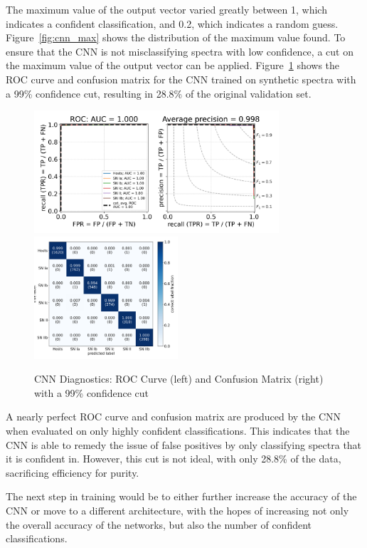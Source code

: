 The maximum value of the output vector varied greatly between 1, which indicates a 
confident classification, and 0.2, which indicates a random guess. Figure~\ref{fig:cnn_max} shows
the distribution of the maximum value found. To ensure that the CNN is not
misclassifying spectra with low confidence, a cut on the maximum value of the
output vector can be applied. Figure~\ref{fig:cnn_qual2} shows the ROC curve and confusion matrix
for the CNN trained on synthetic spectra with a 99\% confidence cut, resulting in 
28.8\% of the original validation set. 
\begin{figure}[b]
    \centering
    \includegraphics[height=4.55cm]{figures/cnn/cnn_roc99.png}
    \quad
    \includegraphics[height=4.55cm]{figures/cnn/cnn_cm99.png}
    \caption[CNN diagnostics with a confidence cut]{CNN Diagnostics: ROC Curve (left) and Confusion Matrix (right) with a 99\% confidence cut\label{fig:cnn_qual2}}
\end{figure}

A nearly perfect ROC curve and confusion matrix are produced by the CNN when
evaluated on only highly confident classifications. This indicates that the CNN
is able to remedy the issue of false positives by only classifying spectra that
it is confident in. However, this cut is not ideal, with only 28.8\% of the
data, sacrificing efficiency for purity.


The next step in training would be to either further increase the accuracy of the CNN 
or move to a different architecture, with the hopes of increasing not only 
the overall accuracy of the networks, but also the number of confident classifications.

